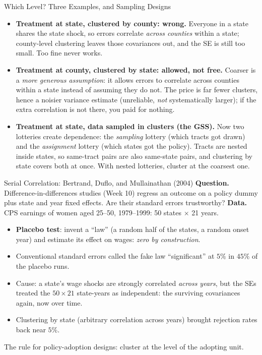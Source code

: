 \documentclass[aspectratio=169,11pt,xcolor=dvipsnames]{beamer}
\newcommand{\core}{\,\raisebox{0.6pt}{\textcolor{corestar}{$\bigstar$}}}
\begin{document}
\begin{frame}{Which Level? Three Examples, and Sampling Designs\core}
\begin{itemize}\itemsep4pt
  \item \textbf{Treatment at state, clustered by county: wrong.} Everyone in
        a state shares the state shock, so errors correlate \emph{across
        counties} within a state; county-level clustering leaves those
        covariances out, and the SE is still too small. Too fine never works.
  \item \textbf{Treatment at county, clustered by state: allowed, not free.}
        Coarser is a \emph{more generous assumption}: it allows errors to
        correlate across counties within a state instead of assuming they do
        not. The price is far fewer clusters, hence a noisier variance
        estimate (unreliable, \emph{not} systematically larger); if the
        extra correlation is not there, you paid for nothing.
  \item \textbf{Treatment at state, data sampled in clusters (the GSS).}
        Now two lotteries create dependence: the \emph{sampling} lottery
        (which tracts got drawn) and the \emph{assignment} lottery (which
        states got the policy). Tracts are nested inside states, so
        same-tract pairs are also same-state pairs, and clustering by state
        covers both at once. \alert{With nested lotteries, cluster at the
        coarsest one.}
\end{itemize}
\end{frame}

\begin{frame}{Serial Correlation: Bertrand, Duflo, and Mullainathan (2004)}
\textbf{Question.} Difference-in-differences studies (Week 10) regress an
outcome on a policy dummy plus state and year fixed effects. Are their
standard errors trustworthy? \textbf{Data.} CPS earnings of women aged
25--50, 1979--1999: 50 states $\times$ 21 years.
\begin{itemize}\itemsep1pt
  \item \textbf{Placebo test}: invent a ``law'' (a random half of the
        states, a random onset year) and estimate its effect on wages:
        \emph{zero by construction}.
  \item Conventional standard errors called the fake law ``significant''
        at $5\%$ in \alert{$45\%$} of the placebo runs.
  \item Cause: a state's wage shocks are strongly correlated \emph{across
        years}, but the SEs treated the $50\times21$ state-years as
        independent: the surviving covariances again, now over time.
  \item Clustering by state (arbitrary correlation across years) brought
        rejection rates back near $5\%$.
\end{itemize}
The rule for policy-adoption designs:
\alert{cluster at the level of the adopting unit}.
\end{frame}
\end{document}
